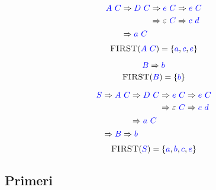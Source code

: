 \documentclass{article}
\newcommand{\FIRST}{\textsc{FIRST}}
\newcommand{\Symbol}[1]{\textcolor{blue}{#1}}
\newcommand{\Null}{\varepsilon}
\newcommand{\Derive}{\Rightarrow}
\newcommand{\Seq}{\ }
\begin{document}
\begin{equation*}
  \Symbol{A} \Seq \Symbol{C} \begin{aligned}[t]
    &\Derive \Symbol{D} \Seq \Symbol{C} \begin{aligned}[t]
      &\Derive \Symbol{e} \Seq \Symbol{C} \Derive \Symbol{e} \Seq \Symbol{C} \\
      &\Derive \Null \Seq \Symbol{C} \Derive \Symbol{c} \Seq \Symbol{d} \\
    \end{aligned}\\
    &\Derive \Symbol{a} \Seq \Symbol{C}
  \end{aligned}
\end{equation*}
\begin{equation*}
  \FIRST(\Symbol{A} \Seq \Symbol{C}) = \{\Symbol{a}, \Symbol{c}, \Symbol{e}\}
\end{equation*}

\begin{equation*}
  \Symbol{B} \Derive \Symbol{b}
\end{equation*}
\begin{equation*}
  \FIRST(\Symbol{B}) = \{\Symbol{b}\}
\end{equation*}

\begin{equation*}
  \Symbol{S} \begin{aligned}[t]
    &\Derive \Symbol{A} \Seq \Symbol{C} \begin{aligned}[t]
      &\Derive \Symbol{D} \Seq \Symbol{C} \begin{aligned}[t]
        &\Derive \Symbol{e} \Seq \Symbol{C} \Derive \Symbol{e} \Seq \Symbol{C} \\
        &\Derive \Null \Seq \Symbol{C} \Derive \Symbol{c} \Seq \Symbol{d} \\
      \end{aligned}\\
      &\Derive \Symbol{a} \Seq \Symbol{C}
    \end{aligned}\\
    &\Derive \Symbol{B} \Derive \Symbol{b}
  \end{aligned}
\end{equation*}
\begin{equation*}
  \FIRST(\Symbol{S}) = \{\Symbol{a}, \Symbol{b}, \Symbol{c}, \Symbol{e}\}
\end{equation*}

\subsection*{Primeri}
\end{document}
